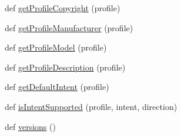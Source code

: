 \begin{DoxyCompactItemize}
\item 
def \hyperlink{namespacePIL_1_1ImageCms_a5d31e3216a3b8887681a0f34f9f1f5e6}{get\+Profile\+Copyright} (profile)
\item 
def \hyperlink{namespacePIL_1_1ImageCms_a41c7060eb43edca637b22ebd34c721ba}{get\+Profile\+Manufacturer} (profile)
\item 
def \hyperlink{namespacePIL_1_1ImageCms_ac26b0034726ca94a6ab2814ef5969f5a}{get\+Profile\+Model} (profile)
\item 
def \hyperlink{namespacePIL_1_1ImageCms_a472a2954f00eaa512e854e09c29ae822}{get\+Profile\+Description} (profile)
\item 
def \hyperlink{namespacePIL_1_1ImageCms_a39c5fba9c276ad18df6525b18f10018c}{get\+Default\+Intent} (profile)
\item 
def \hyperlink{namespacePIL_1_1ImageCms_a2b5c62cc23c2223c3ff86f245c7f2d5d}{is\+Intent\+Supported} (profile, intent, direction)
\item 
def \hyperlink{namespacePIL_1_1ImageCms_ae6c93b85ccb4034d50c4ba1873868bfa}{versions} ()
\end{DoxyCompactItemize}
